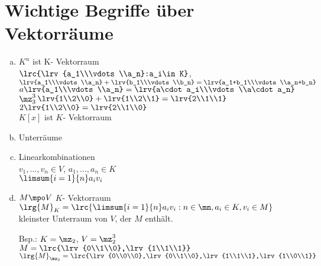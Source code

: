 \section{Wichtige Begriffe über Vektorräume}
	\begin{enumerate}[a)]
		\item $K^n$ ist K- Vektorraum\\
		$\lrc{\lrv{a_1\\\vdots\\a_n}:a_i\in K}$, $\lrv{a_1\\\vdots\\a_n}+\lrv{b_1\\\vdots\\b_n}=
		\lrv{a_1+b_1\\\vdots\\a_n+b_n}$\\
		$a\lrv{a_1\\\vdots\\a_n}=\lrv{a\cdot a_i\\\vdots\\a\cdot a_n}$\\
		$\mz^3_3$\quad$\lrv{1\\2\\0}+\lrv{1\\2\\1}=\lrv{2\\1\\1}$\\
		$2\lrv{1\\2\\0}=\lrv{2\\1\\0}$\\
		$K[x]$ ist $K$- Vektorraum
		\item Unterräume
		\item Linearkombinationen\\
		$v_1,...,v_n\in V$, $a_1,...,a_n\in K$\\
		$\limsum{i=1}{n}a_iv_i$
		\item $M\mpo V$ $K$- Vektorraum\\
		$\lrg{M}_K=\lrc{\limsum{i=1}{n}a_iv_i:n\in\mn,a_i\in K,v_i\in M}$\\
		kleinster Unterraum von $V$, der $M$ enthält.

		Bsp.: $K=\mz_2$, $V=\mz^3_2$\\
		$M=\lrc{\lrv{0\\1\\0},\lrv{1\\1\\1}}$\\
		$\lrg{M}_{\mz_2}=\lrc{\lrv{0\\0\\0},\lrv{0\\1\\0},\lrv{1\\1\\1},\lrv{1\\0\\1}}$


\end{enumerate}
